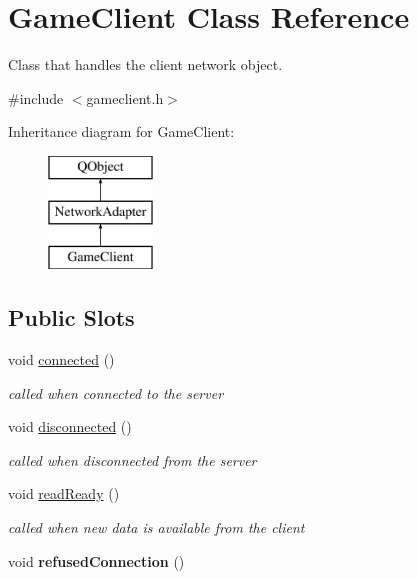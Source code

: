 \hypertarget{class_game_client}{\section{Game\-Client Class Reference}
\label{class_game_client}
}


Class that handles the client network object.  




{\ttfamily \#include $<$gameclient.\-h$>$}

Inheritance diagram for Game\-Client\-:\begin{figure}[H]
\begin{center}
\leavevmode
\includegraphics[height=3.000000cm]{class_game_client}
\end{center}
\end{figure}
\subsection*{Public Slots}
\begin{DoxyCompactItemize}
\item 
\hypertarget{class_game_client_aac63bd682b0cfde980b042bf8145e883}{void \hyperlink{class_game_client_aac63bd682b0cfde980b042bf8145e883}{connected} ()}\label{class_game_client_aac63bd682b0cfde980b042bf8145e883}

\begin{DoxyCompactList}\small\item\em called when connected to the server \end{DoxyCompactList}\item 
\hypertarget{class_game_client_a0a9f1d81df966a4c3955f6a95b056c0e}{void \hyperlink{class_game_client_a0a9f1d81df966a4c3955f6a95b056c0e}{disconnected} ()}\label{class_game_client_a0a9f1d81df966a4c3955f6a95b056c0e}

\begin{DoxyCompactList}\small\item\em called when disconnected from the server \end{DoxyCompactList}\item 
\hypertarget{class_game_client_a5457bdb6b9a17067bbb67a2498ee395d}{void \hyperlink{class_game_client_a5457bdb6b9a17067bbb67a2498ee395d}{read\-Ready} ()}\label{class_game_client_a5457bdb6b9a17067bbb67a2498ee395d}

\begin{DoxyCompactList}\small\item\em called when new data is available from the client \end{DoxyCompactList}\item 
\hypertarget{class_game_client_a65b0e61165542bee701778b54f212afd}{void {\bfseries refused\-Connection} ()}\label{class_game_client_a65b0e61165542bee701778b54f212afd}

\end{DoxyCompactItemize}
